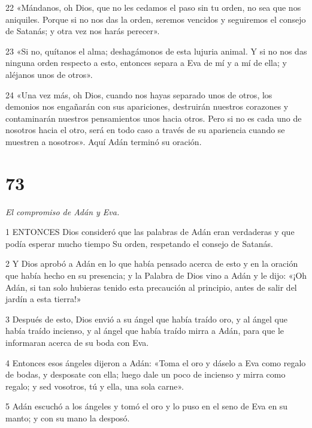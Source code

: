 \par 22 «Mándanos, oh Dios, que no les cedamos el paso sin tu orden, no sea que nos aniquiles. Porque si no nos das la orden, seremos vencidos y seguiremos el consejo de Satanás; y otra vez nos harás perecer».

\par 23 «Si no, quítanos el alma; deshagámonos de esta lujuria animal. Y si no nos das ninguna orden respecto a esto, entonces separa a Eva de mí y a mí de ella; y aléjanos unos de otros».

\par 24 «Una vez más, oh Dios, cuando nos hayas separado unos de otros, los demonios nos engañarán con sus apariciones, destruirán nuestros corazones y contaminarán nuestros pensamientos unos hacia otros. Pero si no es cada uno de nosotros hacia el otro, será en todo caso a través de su apariencia cuando se muestren a nosotros». Aquí Adán terminó su oración.

\chapter{73}

\par \textit{El compromiso de Adán y Eva.}

\par 1 ENTONCES Dios consideró que las palabras de Adán eran verdaderas y que podía esperar mucho tiempo Su orden, respetando el consejo de Satanás.

\par 2 Y Dios aprobó a Adán en lo que había pensado acerca de esto y en la oración que había hecho en su presencia; y la Palabra de Dios vino a Adán y le dijo: «¡Oh Adán, si tan solo hubieras tenido esta precaución al principio, antes de salir del jardín a esta tierra!»

\par 3 Después de esto, Dios envió a su ángel que había traído oro, y al ángel que había traído incienso, y al ángel que había traído mirra a Adán, para que le informaran acerca de su boda con Eva.

\par 4 Entonces esos ángeles dijeron a Adán: «Toma el oro y dáselo a Eva como regalo de bodas, y desposate con ella; luego dale un poco de incienso y mirra como regalo; y sed vosotros, tú y ella, una sola carne».

\par 5 Adán escuchó a los ángeles y tomó el oro y lo puso en el seno de Eva en su manto; y con su mano la desposó.

